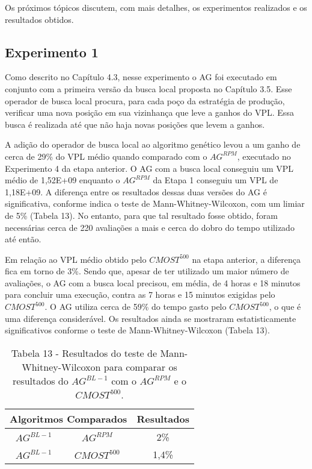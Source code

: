 Os próximos tópicos discutem, com mais detalhes, os experimentos realizados e os resultados obtidos. 


\subsection{Experimento 1}

Como descrito no Capítulo 4.3, nesse experimento o AG foi executado em conjunto com a primeira versão da busca local proposta no Capítulo 3.5. Esse operador de busca local procura, para cada poço da estratégia de produção, verificar uma nova posição em sua vizinhança que leve a ganhos do VPL. Essa busca é realizada até que não haja novas posições que levem a ganhos.

A adição do operador de busca local ao algoritmo genético levou a um ganho de cerca de 29\% do VPL médio quando comparado com o $AG^{RPM}$, executado no Experimento 4 da etapa anterior. O AG com a busca local conseguiu um VPL médio de 1,52E+09 enquanto o $AG^{RPM}$ da Etapa 1 conseguiu um VPL de 1,18E+09. A diferença entre os resultados dessas duas versões do AG é significativa, conforme indica o teste de Mann-Whitney-Wilcoxon, com um limiar de 5\% (Tabela 13). No entanto, para que tal resultado fosse obtido, foram necessárias cerca de 220 avaliações a mais e cerca do dobro do tempo utilizado até então.

Em relação ao VPL médio obtido pelo $CMOST^{500}$ na etapa anterior, a diferença fica em torno de 3\%. Sendo que, apesar de ter utilizado um maior número de avaliações, o AG com a busca local precisou, em média, de 4 horas e 18 minutos para concluir uma execução, contra as 7 horas e 15 minutos exigidas pelo $CMOST^{500}$. O AG utiliza cerca de 59\% do tempo gasto pelo $CMOST^{500}$, o que é uma diferença considerável. Os resultados ainda se mostraram estatisticamente significativos conforme o teste de Mann-Whitney-Wilcoxon  (Tabela 13).

\begin{table}[H]
\centering
\caption{Tabela 13 - Resultados do teste de Mann-Whitney-Wilcoxon para comparar os resultados do $AG^{BL-1}$ com o $AG^{RPM}$ e o $CMOST^{500}$.}

\begin{tabular}{|c|c|c|}
\hline
\multicolumn{2}{|c|}{Algoritmos Comparados} & Resultados \\ \hline
$AG^{BL-1}$ & $AG^{RPM}$ & 2\% \\ \hline
$AG^{BL-1}$ & $CMOST^{500}$ & 1,4\% \\ \hline

\end{tabular}
\end{table}

